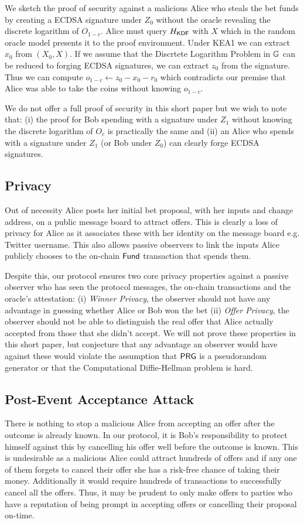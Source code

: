 \documentclass[runningheads]{llncs}
\begin{document}
We sketch the proof of security against a malicious Alice who steals the bet funds by creating a ECDSA signature under $Z_0$ without the oracle revealing the discrete logarithm of $O_{1-c}$. Alice must query $H_{\textsf{KDF}}$ with $X$ which in the random oracle model presents it to the proof environment. Under KEA1 we can extract $x_0$ from $(X_0,X)$. If we assume that the Discrtete Logarithm Problem in $\mathbb{G}$ can be reduced to forging ECDSA signatures, we can extract $z_0$ from the signature. Thus we can compute $o_{1-c} \gets z_0 - x_0 - r_0$ which contradicts our premise that Alice was able to take the coins without knowing $o_{1-c}$.

We do not offer a full proof of security in this short paper but we wish to note that: (i) the proof for Bob spending with a signature under $Z_1$ without knowing the discrete logarithm of $O_c$ is practically the same and (ii) an Alice who spends with a signature under $Z_1$ (or Bob under $Z_0$) can clearly forge ECDSA signatures.

\subsection{Privacy}

Out of necessity Alice posts her initial bet proposal, with her inputs and change address, on a public message board to attract offers. This is clearly a loss of privacy for Alice as it associates these with her identity on the message board e.g. Twitter username. This also allows passive observers to link the inputs Alice publicly chooses to the on-chain $\textsf{Fund}$ transaction that spends them.

Despite this, our protocol ensures two core privacy properties against a passive observer who has seen the protocol messages, the on-chain transactions and the oracle's attestation: (i) \emph{Winner Privacy}, the observer should not have any advantage in guessing whether Alice or Bob won the bet (ii) \emph{Offer Privacy}, the observer should not be able to distinguish the real offer that Alice actually accepted from those that she didn't accept. We will not prove these properties in this short paper, but conjecture that any advantage an observer would have against these would violate the assumption that $\textsf{PRG}$ is a pseudorandom generator or that the Computational Diffie-Hellman problem is hard.

\subsection{Post-Event Acceptance Attack}\label{post-event-acceptance-attack}
There is nothing to stop a malicious Alice from accepting an offer after the outcome is already known. In our protocol, it is Bob's responsibility to protect himself against this by cancelling his offer well before the outcome is known. This is undesirable as a malicious Alice could attract hundreds of offers and if any one of them forgets to cancel their offer she has a risk-free chance of taking their money. Additionally it would require hundreds of transactions to successfully cancel all the offers. Thus, it may be prudent to only make offers to parties who have a reputation of being prompt in accepting offers or cancelling their proposal on-time.
\end{document}
